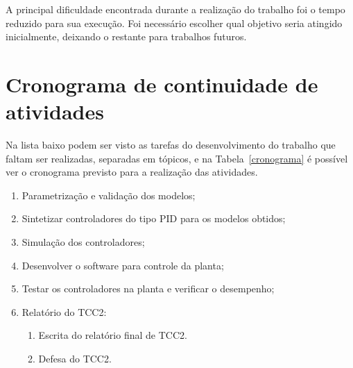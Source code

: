     A principal dificuldade encontrada durante a realização do trabalho foi o tempo reduzido para sua execução. Foi necessário escolher qual objetivo seria atingido inicialmente, deixando o restante para trabalhos futuros.
    
    
\section{Cronograma de continuidade de atividades}
    
    Na lista baixo podem ser visto as tarefas do desenvolvimento do trabalho que faltam ser realizadas, separadas em tópicos, e na Tabela~\ref{cronograma} é possível ver o cronograma previsto para a realização das atividades.
    
    \begin{enumerate}
        \item Parametrização e validação dos modelos;
        \item Sintetizar controladores do tipo PID para os modelos obtidos;
        \item Simulação dos controladores;
        \item Desenvolver o software para controle da planta;
        \item Testar os controladores na planta e verificar o desempenho;
        \item Relatório do TCC2:
            \begin{enumerate}[1)]
                \item Escrita do relatório final de TCC2.
                \item Defesa do TCC2.
            \end{enumerate}
    \end{enumerate}
        

